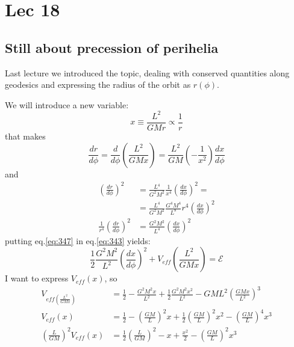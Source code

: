 \section{Lec 18}

\subsection{Still about precession of perihelia}
Last lecture we introduced the topic, dealing with conserved quantities along geodesics and expressing the radius of the orbit as $r\left( \phi  \right)$.\par
We will introduce a new variable:
\[
x \equiv \frac{L^{2}}{GMr} \propto \frac{1}{r} 
\]
that makes
\[
\frac{d r}{d \phi } = \frac{d }{d \phi } \left( \frac{L^{2}}{GMx} \right) = \frac{L^{2}}{GM} \left( - \frac{1}{x^{2}} \right) \frac{d x}{d \phi }
\]
and 
\begin{align}
	\left( \frac{d r}{d \phi } \right)^{2} &= \frac{L^{4}}{G^{2}M^{2}} \frac{1}{x^{4}} \left( \frac{d x}{d \phi } \right)^{2} = \nonumber \\
	&=\frac{L^{4}}{G^{2}M^{2}} \frac{G^{4}M^{4}}{L^{8}} r^{4} \left( \frac{d x}{d \phi } \right)^{2} \nonumber \\
	\frac{1}{r^{4}} \left( \frac{d r}{d \phi } \right)^{2} &= \frac{G^{2}M^{2}}{L^{4}} \left( \frac{d x}{d \phi } \right)^{2} \label{eq:347}
\end{align}
putting eq.\ref{eq:347} in eq.\ref{eq:343} yields:
\begin{equation}\label{eq:348}
\frac{1}{2} \frac{G^{2}M^{2}}{L^{2}} \left( \frac{d x}{d \phi } \right)^{2} + V_{eff}\left( \frac{L^{2}}{GMx} \right) = \mathcal{E}		
\end{equation}
I want to express $V_{eff}\left( x \right)$, so
\begin{align}
	V_{eff\left( \frac{L^{2}}{GMx} \right)} &= \frac{1}{2} - \frac{G^{2}M^{2}x}{L^{2}}+ \frac{1}{2} \frac{G^{2}M^{2}x^{2}}{L^{2}} - GML^{2} \left( \frac{GMx}{L^{2}} \right)^{3} \nonumber \\
  V_{eff}\left( x \right) &= \frac{1}{2} - \left( \frac{GM}{L} \right)^{2}x +  \frac{1}{2}\left( \frac{GM}{L} \right)^{2}x^{2} - \left( \frac{GM}{L} \right)^{4}x^{3} \nonumber \\
  \left( \frac{L}{GM} \right)^{2} V_{eff}\left( x \right)  &= \frac{1}{2}\left( \frac{L}{GM} \right)^{2} - x + \frac{x^{2}}{2} - \left( \frac{GM}{L} \right)^{2}x^{3}
\end{align}


